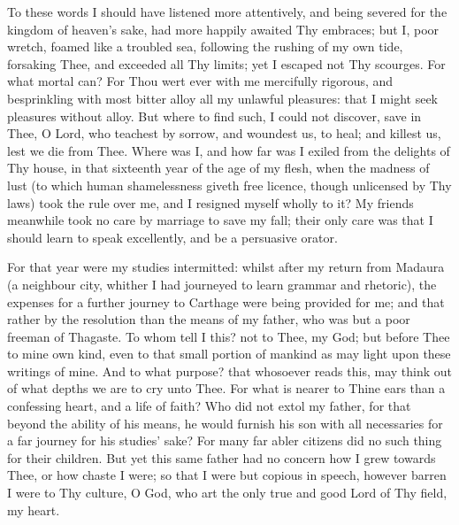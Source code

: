 \documentclass[b5paper,openright,12pt,twoside]{book}
\begin{document}
To these words I should have listened more attentively, and being
severed for the kingdom of heaven's sake, had more happily awaited Thy
embraces; but I, poor wretch, foamed like a troubled sea, following the
rushing of my own tide, forsaking Thee, and exceeded all Thy limits; yet
I escaped not Thy scourges. For what mortal can? For Thou wert ever with
me mercifully rigorous, and besprinkling with most bitter alloy all my
unlawful pleasures: that I might seek pleasures without alloy. But where
to find such, I could not discover, save in Thee, O Lord, who teachest
by sorrow, and woundest us, to heal; and killest us, lest we die from
Thee. Where was I, and how far was I exiled from the delights of Thy
house, in that sixteenth year of the age of my flesh, when the madness
of lust (to which human shamelessness giveth free licence, though
unlicensed by Thy laws) took the rule over me, and I resigned myself
wholly to it? My friends meanwhile took no care by marriage to save my
fall; their only care was that I should learn to speak excellently, and
be a persuasive orator.

For that year were my studies intermitted: whilst after my return from
Madaura (a neighbour city, whither I had journeyed to learn grammar and
rhetoric), the expenses for a further journey to Carthage were being
provided for me; and that rather by the resolution than the means of my
father, who was but a poor freeman of Thagaste. To whom tell I this? not
to Thee, my God; but before Thee to mine own kind, even to that small
portion of mankind as may light upon these writings of mine. And to what
purpose? that whosoever reads this, may think out of what depths we are
to cry unto Thee. For what is nearer to Thine ears than a confessing
heart, and a life of faith? Who did not extol my father, for that beyond
the ability of his means, he would furnish his son with all necessaries
for a far journey for his studies' sake? For many far abler citizens
did no such thing for their children. But yet this same father had no
concern how I grew towards Thee, or how chaste I were; so that I were
but copious in speech, however barren I were to Thy culture, O God, who
art the only true and good Lord of Thy field, my heart.
\end{document}

